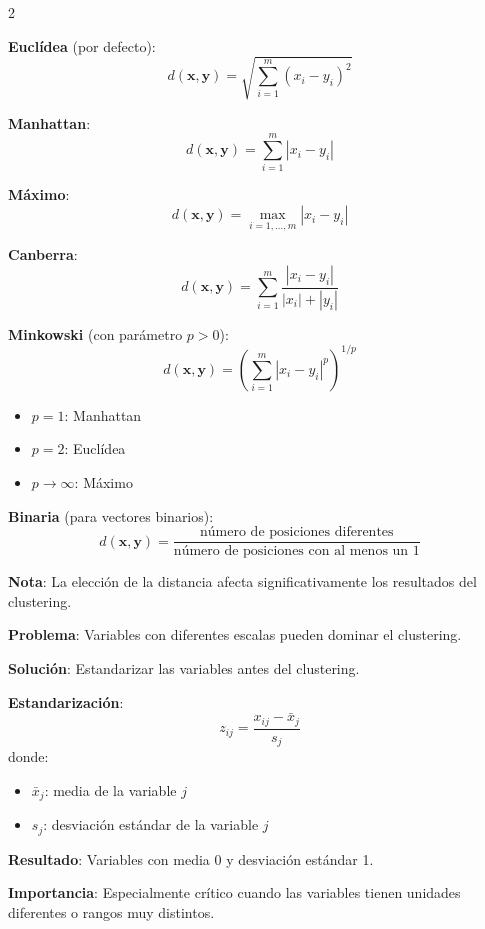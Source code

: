 \documentclass[10pt,a4paper]{article}
\begin{document}

\begin{multicols}{2}
    \begin{tcolorbox}[title=Tipos de Distancias, equal height group=CL4]
        \textbf{Euclídea} (por defecto):
        \[
            d(\mathbf{x}, \mathbf{y}) = \sqrt{\sum_{i=1}^m (x_i - y_i)^2}
        \]
        
        \textbf{Manhattan}:
        \[
            d(\mathbf{x}, \mathbf{y}) = \sum_{i=1}^m |x_i - y_i|
        \]
        
        \textbf{Máximo}:
        \[
            d(\mathbf{x}, \mathbf{y}) = \max_{i=1,\ldots,m} |x_i - y_i|
        \]
        
        \textbf{Canberra}:
        \[
            d(\mathbf{x}, \mathbf{y}) = \sum_{i=1}^m \frac{|x_i - y_i|}{|x_i| + |y_i|}
        \]
    \end{tcolorbox}
    \begin{tcolorbox}[title=Tipos de Distancias (cont.), equal height group=CL4]
        \textbf{Minkowski} (con parámetro $p > 0$):
        \[
            d(\mathbf{x}, \mathbf{y}) = \left(\sum_{i=1}^m |x_i - y_i|^p\right)^{1/p}
        \]
        \begin{itemize}
            \item $p = 1$: Manhattan
            \item $p = 2$: Euclídea
            \item $p \to \infty$: Máximo
        \end{itemize}
        
        \textbf{Binaria} (para vectores binarios):
        \[
            d(\mathbf{x}, \mathbf{y}) = \frac{\text{número de posiciones diferentes}}{\text{número de posiciones con al menos un 1}}
        \]
        
        \textbf{Nota}: La elección de la distancia afecta significativamente los resultados del clustering.
    \end{tcolorbox}
\end{multicols}

\begin{tcolorbox}[title=Escalado de Datos]
    \textbf{Problema}: Variables con diferentes escalas pueden dominar el clustering.
    
    \textbf{Solución}: Estandarizar las variables antes del clustering.
    
    \textbf{Estandarización}:
    \[
        z_{ij} = \frac{x_{ij} - \bar{x}_j}{s_j}
    \]
    donde:
    \begin{itemize}
        \item $\bar{x}_j$: media de la variable $j$
        \item $s_j$: desviación estándar de la variable $j$
    \end{itemize}
    
    \textbf{Resultado}: Variables con media 0 y desviación estándar 1.
    
    \textbf{Importancia}: Especialmente crítico cuando las variables tienen unidades diferentes o rangos muy distintos.
\end{tcolorbox}
\end{document}
